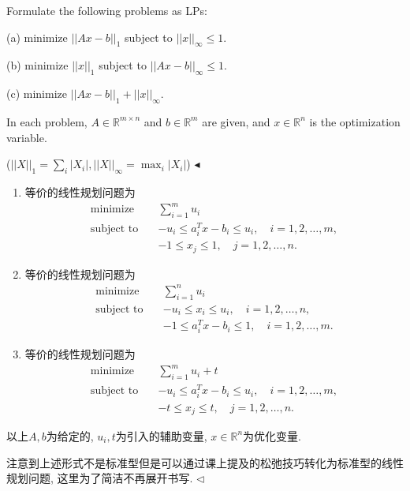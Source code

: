 \documentclass[11pt]{article}
\newenvironment{problem}[2][Problem]{\begin{trivlist}
\item[\hskip \labelsep{\bfseries#1}\hskip\labelsep{\bfseries#2.}]}{\hfill$\blacktriangleleft$\end{trivlist}}
\newenvironment{answer}[1][Answer]{\begin{trivlist}
\item[\hskip \labelsep{\bfseries\itshape#1.}\hskip \labelsep]}{\hfill$\lhd$\end{trivlist}}
\DeclareMathOperator*{\minimize}{minimize}
\begin{document}
\begin{problem}{3. (LP Formulation)}
    Formulate the following problems as LPs:

    (a) minimize $||Ax-b||_1$ subject to $||x||_{\infty} \leqslant 1$.
    
    (b) minimize $||x||_1$ subject to $||Ax-b||_{\infty} \leqslant 1$.
    
    (c) minimize $||Ax-b||_1 + ||x||_{\infty}$.
    
    In each problem, $A\in \mathbb{R}^{m \times n}$ and $b \in \mathbb{R}^m$ are given, and $x\in \mathbb{R}^n$ is the optimization variable.
    
    ($||X||_1 = \sum_i|X_i|, ||X||_{\infty} = \max_i |X_i|$)
\end{problem}
\begin{answer}
    \begin{enumerate}[label = (\alph*)]
        \item 等价的线性规划问题为
        \begin{align*}
            \minimize \quad & \sum_{i=1}^{m} u_i \\
            \text{subject to} \quad & -u_i \leqslant a_i^T x - b_i \leqslant u_i, \quad i = 1, 2, \ldots, m, \\
            & -1 \leqslant x_j \leqslant 1, \quad j = 1, 2, \ldots, n.
        \end{align*}
        \item 等价的线性规划问题为
        \begin{align*}
            \minimize \quad & \sum_{i=1}^{n} u_i \\
            \text{subject to} \quad & - u_i \leqslant x_i \leqslant u_i, \quad i = 1, 2, \ldots, n, \\
            & -1 \leqslant a_i^T x - b_i \leqslant 1, \quad i = 1, 2, \ldots, m.
        \end{align*}
        \item 等价的线性规划问题为
        \begin{align*}
            \minimize \quad & \sum_{i=1}^{m} u_i + t \\
            \text{subject to} \quad & -u_i \leqslant a_i^T x - b_i \leqslant u_i, \quad i = 1, 2, \ldots, m, \\
            & -t \leqslant x_j \leqslant t, \quad j = 1, 2, \ldots, n.
        \end{align*}
    \end{enumerate}
    以上$A,b$为给定的, $u_i, t$为引入的辅助变量, $x \in \mathbb{R}^n$为优化变量. 

    注意到上述形式不是标准型但是可以通过课上提及的松弛技巧转化为标准型的线性规划问题, 这里为了简洁不再展开书写.
\end{answer}
\end{document}
